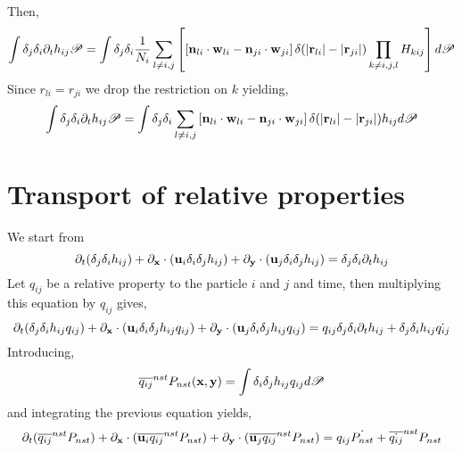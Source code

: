 Then, 
\begin{equation*}
    \int \delta_j\delta_i\partial_t h_{ij} \mathscr{P}
    = \int \delta_j \delta_i
    \frac{1}{N_i} \sum_{l \neq i,j} \left[
        \left[
    \textbf{n}_{li}\cdot \textbf{w}_{li}
    - 
    \textbf{n}_{ji}\cdot\textbf{w}_{ji}
    \right]\delta(|\textbf{r}_{li}| - |\textbf{r}_{ji}|)
        \prod_{k \neq i,j,l}
        H_{kij} 
        \right] d\mathscr{P}
\end{equation*}
Since $r_{li} = r_{ji}$ we drop the restriction on $k$ yielding, 
\begin{equation*}
    \int \delta_j\delta_i\partial_t h_{ij} \mathscr{P}
    = \int \delta_j \delta_i
    \sum_{l \neq i,j} \left[
    \textbf{n}_{li}\cdot \textbf{w}_{li}
    - 
    \textbf{n}_{ji}\cdot\textbf{w}_{ji}
    \right]\delta(|\textbf{r}_{li}| - |\textbf{r}_{ji}|)
        h_{ij}d\mathscr{P}
\end{equation*}


\section{Transport of relative properties}

We start from 
\begin{equation}
    \partial_t (\delta_j\delta_i h_{ij}) + \partial_\textbf{x} \cdot (\textbf{u}_i \delta_i\delta_j h_{ij}) + \partial_\textbf{y} \cdot (\textbf{u}_j \delta_i\delta_j h_{ij}) = \delta_j\delta_i\partial_t h_{ij}
\end{equation}
Let $q_{ij}$ be a relative property to the particle $i$ and $j$ and time, then multiplying this equation by $q_{ij}$ gives,
\begin{equation}
    \partial_t (\delta_j\delta_i h_{ij}q_{ij}) 
    + \partial_\textbf{x} \cdot (\textbf{u}_i \delta_i\delta_j h_{ij}q_{ij}) 
    + \partial_\textbf{y} \cdot (\textbf{u}_j \delta_i\delta_j h_{ij}q_{ij}) 
    = q_{ij}\delta_j\delta_i\partial_t h_{ij}
    + \delta_j\delta_i h_{ij}\dot{q_{ij}}
\end{equation}
Introducing, 
\begin{equation*}
    \overline{q_{ij}}^{nst} P_{nst}(\textbf{x},\textbf{y})= \int\delta_i\delta_j h_{ij}q_{ij} d\mathscr{P} 
\end{equation*}
and integrating the previous equation yields, 
\begin{equation}
    \partial_t (\overline{q_{ij}}^{nst} P_{nst}) 
    + \partial_\textbf{x} \cdot (\overline{\textbf{u}_i q_{ij}}^{nst} P_{nst}) 
    + \partial_\textbf{y} \cdot (\overline{\textbf{u}_j q_{ij}}^{nst}P_{nst}) 
    = q_{ij}\dot{P_{nst}}
    + \overline{\dot{q_{ij}}}^{nst}P_{nst}
\end{equation}

